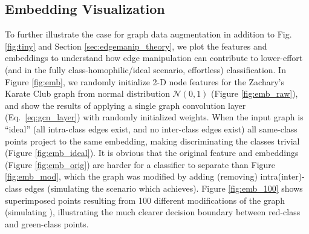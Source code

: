 \documentclass[letterpaper]{article} \usepackage{aaai21}  \usepackage{times}  \usepackage{helvet} \usepackage{courier}  \usepackage[hyphens]{url}  \usepackage{graphicx} \urlstyle{rm} \def\UrlFont{\rm}  \usepackage{natbib}  \usepackage{caption} \frenchspacing  \setlength{\pdfpagewidth}{8.5in}  \setlength{\pdfpageheight}{11in}
\begin{document}
\subsection{Embedding Visualization}
\label{}

To further illustrate the case for graph data augmentation in addition to Fig. \ref{fig:tiny} and Section \ref{sec:edgemanip_theory}, we plot the features and embeddings to understand how edge manipulation can contribute to lower-effort (and in the fully class-homophilic/ideal scenario, effortless) classification. In Figure \ref{fig:emb}, we randomly initialize 2-D node features for the Zachary’s Karate Club graph from normal distribution $\mathcal{N}(0, 1)$ (Figure \ref{fig:emb_raw}), and show the results of applying a single graph convolution layer (Eq.~\ref{eq:gcn_layer}) with randomly initialized weights. When the input graph is ``ideal'' (all intra-class edges exist, and no inter-class edges exist) all same-class points project to the same embedding, making discriminating the classes trivial (Figure \ref{fig:emb_ideal}). It is obvious that the original feature and embeddings (Figure \ref{fig:emb_orig}) are harder for a classifier to separate than Figure \ref{fig:emb_mod}, which the graph was modified by adding (removing) intra(inter)-class edges (simulating the scenario which \methodtwo achieves). Figure \ref{fig:emb_100} shows superimposed points resulting from 100 different modifications of the graph (simulating \method), illustrating the much clearer decision boundary between red-class and green-class points.



 
\end{document}
